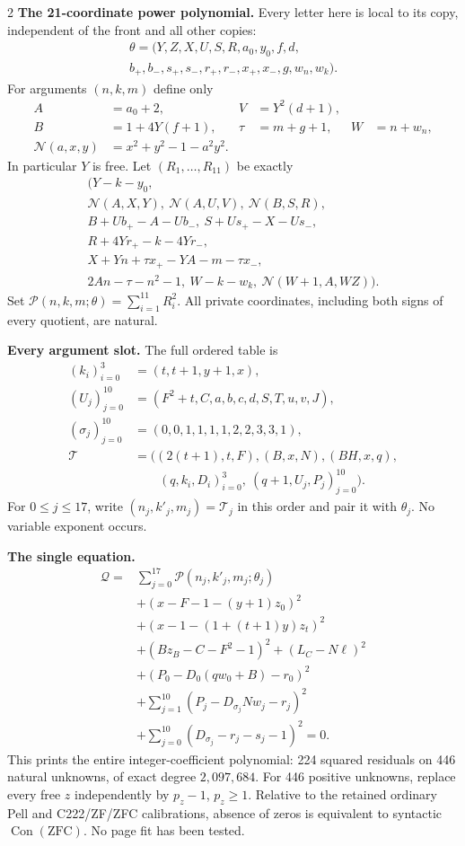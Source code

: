 \documentclass[10pt,letterpaper]{article}
\newcommand{\PP}{\mathcal P}
\newcommand{\QQ}{\mathcal Q}
\begin{document}
\begin{multicols}{2}
\textbf{The 21-coordinate power polynomial.} Every letter here is local
to its copy, independent of the front and all other copies:
\[
\begin{gathered}
\theta=(Y,Z,X,U,S,R,a_0,y_0,f,d,\\
b_+,b_-,s_+,s_-,r_+,r_-,x_+,x_-,g,w_n,w_k).
\end{gathered}
\]
For arguments $(n,k,m)$ define only
\[
\begin{aligned}
A&=a_0+2,&V&=Y^2(d+1),\\
B&=1+4Y(f+1),&\tau&=m+g+1,&W&=n+w_n,\\
\mathcal N(a,x,y)&=x^2+y^2-1-a^2y^2.
\end{aligned}
\]
In particular $Y$ is free. Let $(R_1,\ldots,R_{11})$ be exactly
\[
\begin{gathered}
\bigl(Y-k-y_0,\\
\mathcal N(A,X,Y),\ \mathcal N(A,U,V),\ \mathcal N(B,S,R),\\
B+Ub_+-A-Ub_-,\ S+Us_+-X-Us_-,\\
R+4Yr_+-k-4Yr_-,\\
X+Yn+\tau x_+-YA-m-\tau x_-,\\
2An-\tau-n^2-1,\ W-k-w_k,\ \mathcal N(W+1,A,WZ)\bigr).
\end{gathered}
\]
Set $\PP(n,k,m;\theta)=\sum_{i=1}^{11}R_i^2$.
All private coordinates, including both signs of every quotient, are natural.

\textbf{Every argument slot.} The full ordered table is
\[
\begin{aligned}
(k_i)_{i=0}^3&=(t,t+1,y+1,x),\\
(U_j)_{j=0}^{10}&=(F^2+t,C,a,b,c,d,S,T,u,v,J),\\
(\sigma_j)_{j=0}^{10}&=(0,0,1,1,1,1,2,2,3,3,1),\\
\mathcal T&=\bigl((2(t+1),t,F),(B,x,N),(BH,x,q),\\
&\qquad(q,k_i,D_i)_{i=0}^3,\ (q+1,U_j,P_j)_{j=0}^{10}\bigr).
\end{aligned}
\]
For $0\le j\le17$, write $(n_j,k'_j,m_j)=\mathcal T_j$ in this
order and pair it with $\theta_j$. No variable exponent occurs.

\textbf{The single equation.}
\[
\boxed{\begin{aligned}
\QQ={}&\sum_{j=0}^{17}\PP(n_j,k'_j,m_j;\theta_j)\\
&+(x-F-1-(y+1)z_0)^2\\
&+(x-1-(1+(t+1)y)z_t)^2\\
&+(Bz_B-C-F^2-1)^2+(L_C-N\ell)^2\\
&+(P_0-D_0(qw_0+B)-r_0)^2\\
&+\sum_{j=1}^{10}(P_j-D_{\sigma_j}Nw_j-r_j)^2\\
&+\sum_{j=0}^{10}(D_{\sigma_j}-r_j-s_j-1)^2=0.
\end{aligned}}
\]
This prints the entire integer-coefficient polynomial: 224 squared
residuals on 446 natural unknowns, of exact degree $2{,}097{,}684$.
For 446 positive unknowns, replace every free $z$ independently by
$p_z-1$, $p_z\ge1$. Relative to the retained ordinary Pell and
C222/ZF/ZFC calibrations, absence of zeros is equivalent to syntactic
$\operatorname{Con}(\mathrm{ZFC})$. No page fit has been tested.
\end{multicols}
\end{document}
